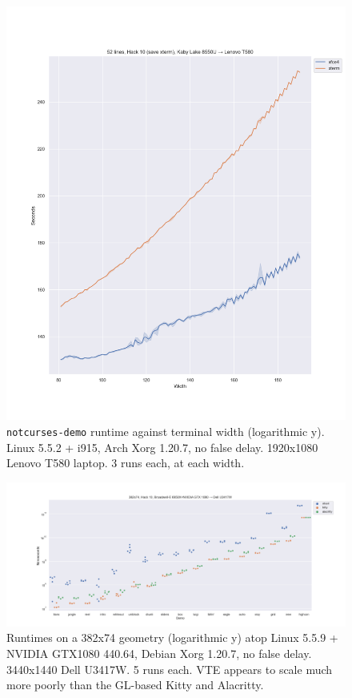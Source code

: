 \begin{figure}[!htb]
\centering
\includegraphics[width=1\textwidth]{media/termsdemo.png}
\caption[Intel i7-8550U benchmarks, varying widths.]{\texttt{notcurses-demo} runtime against terminal width (logarithmic y). Linux 5.5.2 + i915, Arch Xorg 1.20.7, no false delay. 1920x1080 Lenovo T580 laptop. 3 runs each, at each width.}
\label{fig:intel-full}
\end{figure}

\begin{figure}[!htb]
\centering
\includegraphics[width=1\textwidth]{media/d0-large-nvidia.png}
\caption[382x74 NVIDIA GTX 1080 benchmarks.]{Runtimes on a 382x74 geometry (logarithmic y) atop Linux 5.5.9 + NVIDIA GTX1080 440.64, Debian Xorg 1.20.7, no false delay. 3440x1440 Dell U3417W. 5 runs each. VTE appears to scale much more poorly than the GL-based Kitty and Alacritty.}
\label{fig:nvidia-full}
\end{figure}


